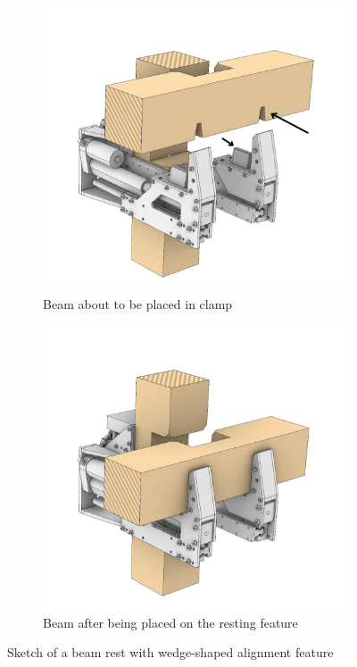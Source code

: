 \begin{figure}[p]
    \centering
    \begin{subfigure}[b]{0.49\textwidth}
        \centering
        \includegraphics[width=\textwidth]{images/04-3/beam-rest-arrow.jpg}
        \caption{Beam about to be placed in clamp}
    \end{subfigure}
    \hfill
    \begin{subfigure}[b]{0.49\textwidth}
        \centering
        \includegraphics[width=\textwidth]{images/04-3/beam-rest2.jpg}
        \caption{Beam after being placed on the resting feature}
    \end{subfigure}
    \caption{Sketch of a beam rest with wedge-shaped alignment feature}
    \label{fig:beam-rest-feature}
\end{figure}



